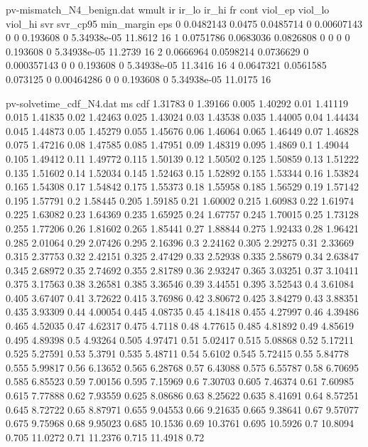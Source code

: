\begin{filecontents*}[overwrite]{pv-mismatch_N4_benign.dat}
wmult ir ir_lo ir_hi fr cont viol_ep viol_lo viol_hi svr svr_cp95 min_margin eps
0 0.0482143 0.0475 0.0485714 0 0.00607143 0 0 0.193608 0 5.34938e-05 11.8612 16
1 0.0751786 0.0683036 0.0826808 0 0 0 0 0.193608 0 5.34938e-05 11.2739 16
2 0.0666964 0.0598214 0.0736629 0 0.000357143 0 0 0.193608 0 5.34938e-05 11.3416 16
4 0.0647321 0.0561585 0.073125 0 0.00464286 0 0 0.193608 0 5.34938e-05 11.0175 16
\end{filecontents*}
\begin{filecontents*}[overwrite]{pv-solvetime_cdf_N4.dat}
ms cdf
1.31783 0
1.39166 0.005
1.40292 0.01
1.41119 0.015
1.41835 0.02
1.42463 0.025
1.43024 0.03
1.43538 0.035
1.44005 0.04
1.44434 0.045
1.44873 0.05
1.45279 0.055
1.45676 0.06
1.46064 0.065
1.46449 0.07
1.46828 0.075
1.47216 0.08
1.47585 0.085
1.47951 0.09
1.48319 0.095
1.4869 0.1
1.49044 0.105
1.49412 0.11
1.49772 0.115
1.50139 0.12
1.50502 0.125
1.50859 0.13
1.51222 0.135
1.51602 0.14
1.52034 0.145
1.52463 0.15
1.52892 0.155
1.53344 0.16
1.53824 0.165
1.54308 0.17
1.54842 0.175
1.55373 0.18
1.55958 0.185
1.56529 0.19
1.57142 0.195
1.57791 0.2
1.58445 0.205
1.59185 0.21
1.60002 0.215
1.60983 0.22
1.61974 0.225
1.63082 0.23
1.64369 0.235
1.65925 0.24
1.67757 0.245
1.70015 0.25
1.73128 0.255
1.77206 0.26
1.81602 0.265
1.85441 0.27
1.88844 0.275
1.92433 0.28
1.96421 0.285
2.01064 0.29
2.07426 0.295
2.16396 0.3
2.24162 0.305
2.29275 0.31
2.33669 0.315
2.37753 0.32
2.42151 0.325
2.47429 0.33
2.52938 0.335
2.58679 0.34
2.63847 0.345
2.68972 0.35
2.74692 0.355
2.81789 0.36
2.93247 0.365
3.03251 0.37
3.10411 0.375
3.17563 0.38
3.26581 0.385
3.36546 0.39
3.44551 0.395
3.52543 0.4
3.61084 0.405
3.67407 0.41
3.72622 0.415
3.76986 0.42
3.80672 0.425
3.84279 0.43
3.88351 0.435
3.93309 0.44
4.00054 0.445
4.08735 0.45
4.18418 0.455
4.27997 0.46
4.39486 0.465
4.52035 0.47
4.62317 0.475
4.7118 0.48
4.77615 0.485
4.81892 0.49
4.85619 0.495
4.89398 0.5
4.93264 0.505
4.97471 0.51
5.02417 0.515
5.08868 0.52
5.17211 0.525
5.27591 0.53
5.3791 0.535
5.48711 0.54
5.6102 0.545
5.72415 0.55
5.84778 0.555
5.99817 0.56
6.13652 0.565
6.28768 0.57
6.43088 0.575
6.55787 0.58
6.70695 0.585
6.85523 0.59
7.00156 0.595
7.15969 0.6
7.30703 0.605
7.46374 0.61
7.60985 0.615
7.77888 0.62
7.93559 0.625
8.08686 0.63
8.25622 0.635
8.41691 0.64
8.57251 0.645
8.72722 0.65
8.87971 0.655
9.04553 0.66
9.21635 0.665
9.38641 0.67
9.57077 0.675
9.75968 0.68
9.95023 0.685
10.1536 0.69
10.3761 0.695
10.5926 0.7
10.8094 0.705
11.0272 0.71
11.2376 0.715
11.4918 0.72

\end{filecontents*}
